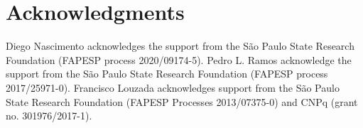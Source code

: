 \documentclass[]{interact}
\theoremstyle{plain}%
\theoremstyle{definition}
\theoremstyle{remark}
\begin{document}
\section*{Acknowledgments}

Diego Nascimento acknowledges the support from the S\~ao Paulo State Research Foundation (FAPESP process 2020/09174-5). Pedro L. Ramos acknowledge the support from the S\~ao Paulo State Research Foundation (FAPESP process 2017/25971-0). Francisco Louzada acknowledges support from the S\~ao Paulo State
Research Foundation (FAPESP Processes 2013/07375-0) and CNPq (grant no. 301976/2017-1).




\end{document}
